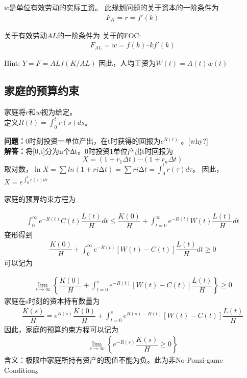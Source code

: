 $ w  $是单位有效劳动的实际工资。
此规划问题的关于资本的一阶条件为
\begin{gather}
	F_K = r =f'(k)
\end{gather}

关于有效劳动$ AL $的一阶条件为
关于的FOC:
\begin{gather}
F_{AL} = w =f(k) – kf'(k)
\end{gather}

Hint: $ Y=F=ALf(K/AL) $
因此，人均工资为$ W(t)=A(t)w(t) $

\subsection{家庭的预算约束}

家庭将$ r  $和$ w  $视为给定。\\

定义$ R(t)=\int_{0}^{t}r(s)ds $。

\textbf{问题：}0时刻投资一单位产出，在t时获得的回报为$ e^{R(t)} $ 。[why?]\\
\textbf{解答：}将[0,t]分为n个∆t。0时投资1单位产出t时回报为
\[X=(1+r_1\Delta t)\cdots(1+r_n\Delta t)\]
取对数，$ \ln X=∑ln(1+ri∆t)=∑ri∆t=\int_{0}^{t} r(\tau)d\tau$。 因此，$ X=e^{\int_{0}^{t} r(\tau)d\tau} $

家庭的预算约束方程为

\begin{gather}
	\int_{0}^{\infty}e^{-R(t)}C(t)\dfrac{L(t)}{H}dt
	\le \dfrac{K(0)}{H}+\int_{t=0}^{\infty}e^{-R(t)}W(t)
	\dfrac{L(t)}{H}dt
\end{gather}
变形得到
\begin{gather}
	\dfrac{K(0)}{H}+\int_{0}^{\infty}e^{-R(t)}[W(t)-C(t)]\dfrac{L(t)}{H}dt\ge 0
\end{gather}
可以记为

\begin{gather}
	\lim\limits_{s\to \infty}
	\left\{
	\dfrac{K(0)}{H}+\int_{t=0}^{s}e^{-R(t)}
	[
	W(t)-C(t)
	]\dfrac{L(t)}{H}
	\right\}\ge 0
\end{gather}
家庭在s时刻的资本持有数量为
\begin{gather}
	\dfrac{K(s)}{H}=e^{R(s)}\dfrac{K(0)}{H}+\int_{t=0}^{s}e^{R(s)-R(t)}[
	W(t)-C(t)
	]\dfrac{L(t)}{H}
\end{gather}
因此，家庭的预算约束方程可以记为
\begin{gather}
	\lim\limits_{s\to\infty}
	\left\{
	e^{-R(s)}\dfrac{K(s)}{H}\ge 0
	\right\}
\end{gather}
含义：极限中家庭所持有资产的现值不能为负。此为非No-Ponzi-game Condition。

